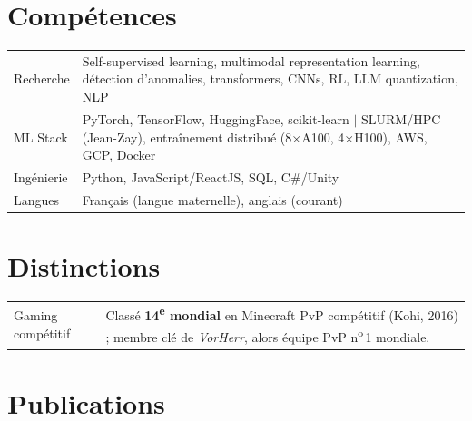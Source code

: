 \documentclass[a4paper,11pt]{article}
\begin{document}
\section{Compétences}
\begin{tabularx}{\linewidth}{@{}l X@{}}
Recherche       & \small{Self-supervised learning, multimodal representation learning, détection d'anomalies, transformers, CNNs, RL, LLM quantization, NLP} \\[-2pt]
ML Stack        & \small{PyTorch, TensorFlow, HuggingFace, scikit-learn $|$ SLURM/HPC (Jean-Zay), entraînement distribué (8$\times$A100, 4$\times$H100), AWS, GCP, Docker} \\[-2pt]
Ingénierie      & \small{Python, JavaScript/ReactJS, SQL, C\#/Unity} \\[-2pt]
Langues         & \small{Français (langue maternelle), anglais (courant)} \\
\end{tabularx}

\section{Distinctions}
\begin{tabularx}{\linewidth}{@{}l X@{}}
Gaming compétitif & \small{Classé \textbf{14\textsuperscript{e} mondial} en Minecraft PvP compétitif (Kohi, 2016) ; membre clé de \textit{VorHerr}, alors équipe PvP n\textsuperscript{o}\,1 mondiale.} \\
\end{tabularx}

\section{Publications}
\begin{refsection}
\nocite{*}
\printbibliography[heading=none]
\end{refsection}

\vspace{2pt}
\end{document}

